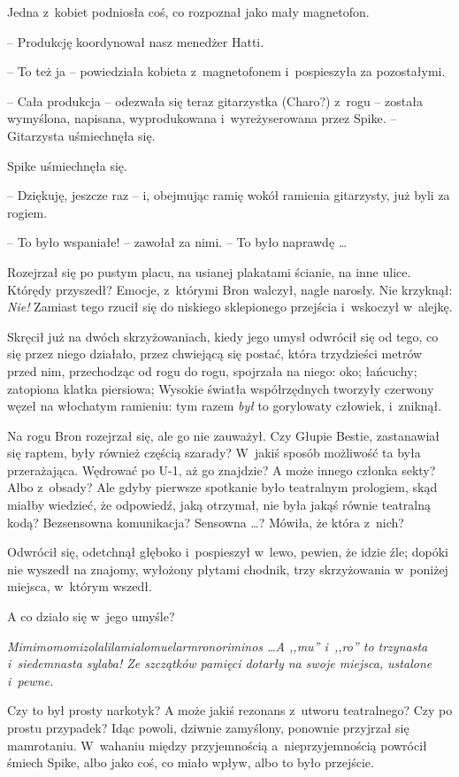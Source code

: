 \documentclass[oneside,polish,11pt,rmheadings]{mwbk}
\begin{document}
Jedna z~kobiet podniosła coś, co rozpoznał jako mały magnetofon. 

-- Produkcję koordynował nasz menedżer Hatti. 

-- To też ja -- powiedziała kobieta z~magnetofonem i~pospieszyła za pozostałymi. 

-- Cała produkcja -- odezwała się teraz gitarzystka (Charo?) z~rogu -- została wymyślona, napisana, wyprodukowana i~wyreżyserowana przez Spike. -- Gitarzysta uśmiechnęła się. 

Spike uśmiechnęła się. 

-- Dziękuję, jeszcze raz -- i, obejmując ramię wokół ramienia gitarzysty, już byli za rogiem. 

-- To było wspaniałe! -- zawołał za nimi. -- To było naprawdę \ldots   

Rozejrzał się po pustym placu, na usianej plakatami ścianie, na inne ulice. Którędy przyszedł? Emocje, z~którymi Bron walczył, nagle narosły. Nie krzyknął: \textit{Nie!} Zamiast tego rzucił się do niskiego sklepionego przejścia i~wskoczył w~alejkę. 

Skręcił już na dwóch skrzyżowaniach, kiedy jego umysł odwrócił się od tego, co się przez niego działało, przez chwiejącą się postać, która trzydzieści metrów przed nim, przechodząc od rogu do rogu, spojrzała na niego: oko; łańcuchy; zatopiona klatka piersiowa; Wysokie światła współrzędnych tworzyły czerwony węzeł na włochatym ramieniu: tym razem \textit{był }to gorylowaty człowiek, i~zniknął. 

Na rogu Bron rozejrzał się, ale go nie zauważył. Czy Głupie Bestie, zastanawiał się raptem, były również częścią szarady? W~jakiś sposób możliwość ta była przerażająca. Wędrować po U-1, aż go znajdzie? A może innego członka sekty? Albo z~obsady? Ale gdyby pierwsze spotkanie było teatralnym prologiem, skąd miałby wiedzieć, że odpowiedź, jaką otrzymał, nie była jakąś równie teatralną kodą? Bezsensowna komunikacja? Sensowna \ldots ? Mówiła, że która z~nich? 

Odwrócił się, odetchnął głęboko i~pospieszył w~lewo, pewien, że idzie źle; dopóki nie wyszedł na znajomy, wyłożony płytami chodnik, trzy skrzyżowania w~poniżej miejsca, w~którym wszedł. 

A co działo się w~jego umyśle? 

\textit{Mimimomomizolalilamialomuelarmronoriminos \ldots  A ,,mu'' i~,,ro'' to trzynasta i~siedemnasta sylaba! Ze szczątków pamięci dotarły na swoje miejsca, ustalone i~pewne.} 

Czy to był prosty narkotyk? A może jakiś rezonans z~utworu teatralnego? Czy po prostu przypadek? Idąc powoli, dziwnie zamyślony, ponownie przyjrzał się mamrotaniu. W~wahaniu między przyjemnością a~nieprzyjemnością powrócił śmiech Spike, albo jako coś, co miało wpływ, albo to było przejście. 
\end{document}
